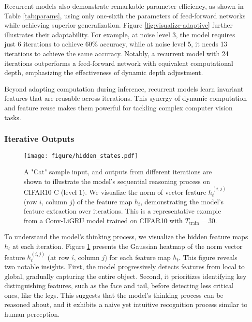 Recurrent models also demonstrate remarkable parameter efficiency, as shown in Table \ref{tab:params}, using only one-sixth the parameters of feed-forward networks while achieving superior generalization. 
Figure \ref{fig:visualize-adaptive} further illustrates their adaptability. 
For example, at noise level 3, the model requires just 6 iterations to achieve 60\% accuracy, while at noise level 5, it needs 13 iterations to achieve the same accuracy. 
Notably, a recurrent model with 24 iterations outperforms a feed-forward network with equivalent computational depth, emphasizing the effectiveness of dynamic depth adjustment. 

Beyond adapting computation during inference, recurrent models learn invariant features that are reusable across iterations. 
This synergy of dynamic computation and feature reuse makes them powerful for tackling complex computer vision tasks.

\subsubsection{Iterative Outputs}
\begin{figure}[h]
    \centering
    \texttt{[image: figure/hidden\_states.pdf]}
    \caption{A "Cat" sample input, and outputs from different iterations are shown to illustrate the model’s sequential reasoning process on CIFAR10-C (level 1). We visualize the norm of vector feature \( h^{(i, j)}_t \) (row \( i \), column \( j \)) of the feature map \( h_t \), demonstrating the model’s feature extraction over iterations. This is a representative example from a Conv-LiGRU model trained on CIFAR10 with \( T_{\text{train}} = 30 \).}
    \label{fig:hidden_states}
\end{figure}

To understand the model's thinking process, we visualize the hidden feature maps \( h_t \) at each iteration. Figure \ref{fig:hidden_states} presents the Gaussian heatmap of the norm vector feature \( h^{(i, j)}_t \) (at row \( i \), column \( j \)) for each feature map \( h_t \). This figure reveals two notable insights. First, the model progressively detects features from local to global, gradually capturing the entire object. Second, it prioritizes identifying key distinguishing features, such as the face and tail, before detecting less critical ones, like the legs. This suggests that the model’s thinking process can be reasoned about, and it exhibits a naive yet intuitive recognition process similar to human perception.

